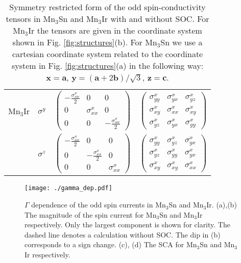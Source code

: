 \documentclass[aps,prl,reprint,amsmath,amssymb,superscriptaddress]{revtex4-1}
\begin{document}
\begin{table}
\begin{ruledtabular}
\begin{tabular}{cccc}
   Mn$_3$Ir &$\sigma^y$ & $\left(\begin{matrix}- \frac{\sigma^x_{xx}}{2} & 0 & 0\\0 & \sigma^x_{xx} & 0\\0 & 0 & - \frac{\sigma^x_{xx}}{2}\end{matrix}\right)$
   & $\left(\begin{matrix}\sigma^x_{yy} & \sigma^x_{yx} & \sigma^x_{yz}\\\sigma^x_{xy} & \sigma^x_{xx} & \sigma^x_{xy}\\\sigma^x_{yz} & \sigma^x_{yx} & \sigma^x_{yy}\end{matrix}\right)$\\
   &$\sigma^z$ & $\left(\begin{matrix}- \frac{\sigma^x_{xx}}{2} & 0 & 0\\0 & - \frac{\sigma^x_{xx}}{2} & 0\\0 & 0 & \sigma^x_{xx} \end{matrix}\right)$
   & $\left(\begin{matrix}\sigma^x_{yy} & \sigma^x_{yz} & \sigma^x_{yx}\\\sigma^x_{yz} & \sigma^x_{yy} & \sigma^x_{yx}\\\sigma^x_{xy} & \sigma^x_{xy} & \sigma^x_{xx}\end{matrix}\right)$
 \end{tabular}
\end{ruledtabular}
\caption{Symmetry restricted form of the odd spin-conductivity tensors in Mn$_3$Sn and Mn$_3$Ir with and without SOC. For Mn$_3$Ir the tensors are given in the coordinate system shown in Fig. \ref{fig:structures}(b). For Mn$_3$Sn we use a cartesian coordinate system related to the coordinate system in Fig. \ref{fig:structures}(a) in the following way: $\mathbf{x}=\mathbf{a}$, $\mathbf{y}=(\mathbf{a}+2\mathbf{b})/\sqrt{3}$, $\mathbf{z} = \mathbf{c}$.}
\label{tab:symmetry}
\end{table}

\begin{figure}[h]
  \centering
  \texttt{[image: ./gamma\_dep.pdf]}
  \caption{$\Gamma$ dependence of the odd spin currents in Mn$_3$Sn and Mn$_3$Ir.  (a),(b) The magnitude of the spin current for Mn$_3$Sn and Mn$_3$Ir respectively. Only the largest component is shown for clarity. The dashed line denotes a calculation without SOC. The dip in (b) corresponds to a sign change. (c), (d) The SCA for Mn$_3$Sn and Mn$_3$Ir respectively. }
  \label{fig:gamma_dep}
\end{figure}
\end{document}
